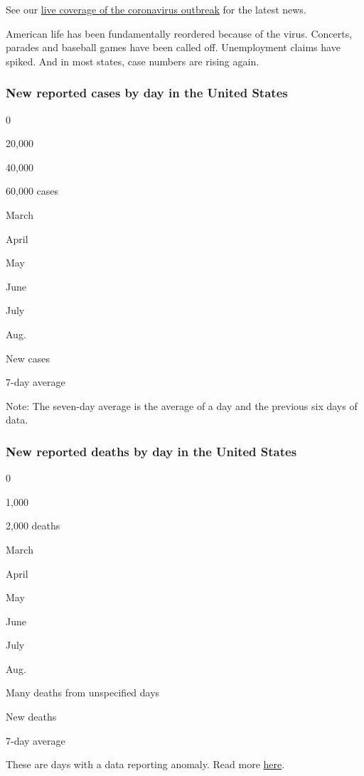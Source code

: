 See our
\href{https://www.nytimes.com/2020/08/01/world/coronavirus-covid-19.html}{live
coverage of the coronavirus outbreak} for the latest news.

American life has been fundamentally reordered because of the virus.
Concerts, parades and baseball games have been called off. Unemployment
claims have spiked. And in most states, case numbers are rising again.

\hypertarget{new-reported-cases-by-day-in-the-united-states}{%
\subsubsection{New reported cases by day in the United
States}\label{new-reported-cases-by-day-in-the-united-states}}

0

20,000

40,000

60,000 cases

March

April

May

June

July

Aug.

New cases

7-day average

Note: The seven-day average is the average of a day and the previous six
days of data.

\hypertarget{new-reported-deaths-by-day-in-the-united-states}{%
\subsubsection{New reported deaths by day in the United
States}\label{new-reported-deaths-by-day-in-the-united-states}}

0

1,000

2,000 deaths

March

April

May

June

July

Aug.

Many deaths from unspecified days

New deaths

7-day average

These are days with a data reporting anomaly. Read more
\protect\hyperlink{anomaly-notes}{here}.

